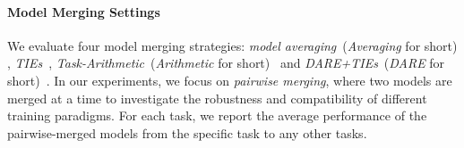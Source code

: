 \documentclass{article} %
\begin{document}



\paragraph{Model Merging Settings} 
We evaluate four model merging strategies: \emph{model averaging}~(\emph{Averaging} for short) \citep{choshen2022fusingfinetunedmodelsbetter}, \emph{TIEs}~\citep{yadav2023ties}, \emph{Task-Arithmetic}~(\emph{Arithmetic} for short)~\citep{ilharco2023editingmodelstaskarithmetic} and \emph{DARE+TIEs}~(\emph{DARE} for short)~\citep{yu2024language}. In our experiments, we focus on \emph{pairwise merging}, where two models are merged at a time to investigate the robustness and compatibility of different training paradigms. For each task, we report the average performance of the pairwise-merged models from the specific task to any other tasks.
\end{document}
